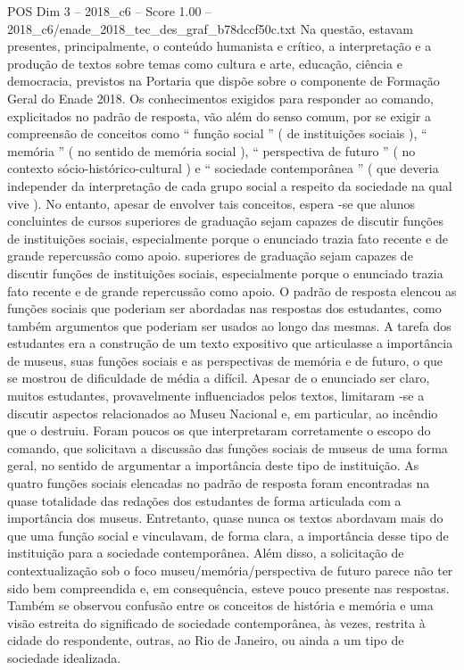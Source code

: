 \begin{textsample}{POS Dim 3 – 2018\_c6 – Score 1.00 – 2018\_c6/enade\_2018\_tec\_des\_graf\_b78dccf50c.txt}
Na questão, estavam presentes, principalmente, o conteúdo humanista e crítico, a interpretação e a produção de textos sobre temas como cultura e arte, educação, ciência e democracia, previstos na Portaria que dispõe sobre o componente de Formação Geral do Enade 2018.
Os conhecimentos exigidos para responder ao comando, explicitados no padrão de resposta, vão além do senso comum, por se exigir a compreensão de conceitos como “ função social ” ( de instituições sociais ), “ memória ” ( no sentido de memória social ), “ perspectiva de futuro ” ( no contexto sócio-histórico-cultural ) e “ sociedade contemporânea ” ( que deveria independer da interpretação de cada grupo social a respeito da sociedade na qual vive ).
No entanto, apesar de envolver tais conceitos, espera -se que alunos concluintes de cursos superiores de graduação sejam capazes de discutir funções de instituições sociais, especialmente porque o enunciado trazia fato recente e de grande repercussão como apoio. superiores de graduação sejam capazes de discutir funções de instituições sociais, especialmente porque o enunciado trazia fato recente e de grande repercussão como apoio.
O padrão de resposta elencou as funções sociais que poderiam ser abordadas nas respostas dos estudantes, como também argumentos que poderiam ser usados ao longo das mesmas.
A tarefa dos estudantes era a construção de um texto expositivo que articulasse a importância de museus, suas funções sociais e as perspectivas de memória e de futuro, o que se mostrou de dificuldade de média a difícil.
Apesar de o enunciado ser claro, muitos estudantes, provavelmente influenciados pelos textos, limitaram -se a discutir aspectos relacionados ao Museu Nacional e, em particular, ao incêndio que o destruiu.
Foram poucos os que interpretaram corretamente o escopo do comando, que solicitava a discussão das funções sociais de museus de uma forma geral, no sentido de argumentar a importância deste tipo de instituição.
As quatro funções sociais elencadas no padrão de resposta foram encontradas na quase totalidade das redações dos estudantes de forma articulada com a importância dos museus.
Entretanto, quase nunca os textos abordavam mais do que uma função social e vinculavam, de forma clara, a importância desse tipo de instituição para a sociedade contemporânea.
Além disso, a solicitação de contextualização sob o foco museu/memória/perspectiva de futuro parece não ter sido bem compreendida e, em consequência, esteve pouco presente nas respostas.
Também se observou confusão entre os conceitos de história e memória e uma visão estreita do significado de sociedade contemporânea, às vezes, restrita à cidade do respondente, outras, ao Rio de Janeiro, ou ainda a um tipo de sociedade idealizada.

\end{textsample}
